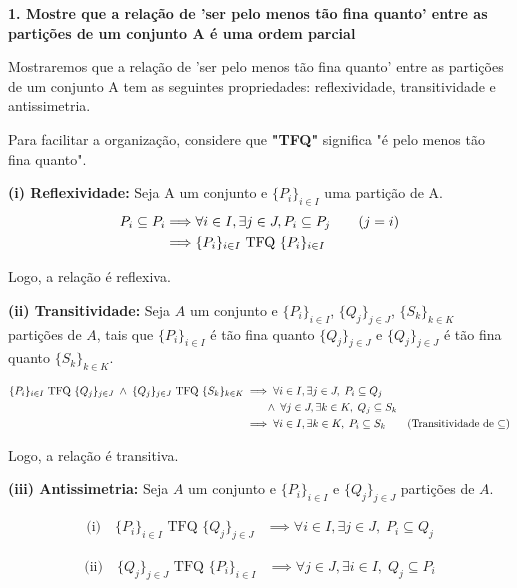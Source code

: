 \documentclass{article}
\begin{document}
\textbf{1. Mostre que a relação de 'ser pelo menos tão fina quanto' entre as partições de um conjunto A é uma ordem parcial}

Mostraremos que a relação de 'ser pelo menos tão fina quanto' entre as partições de um conjunto A tem as seguintes propriedades: reflexividade, transitividade e antissimetria.

Para facilitar a organização, considere que \textbf{"TFQ"} significa "é pelo menos tão fina quanto".

\textbf{(i) Reflexividade:}
Seja A um conjunto e $\{P_i\}_{i \in I}$ uma partição de A.
\begin{align*}
	P_i \subseteq P_i
	 & \Longrightarrow \forall i \in I, \exists j \in J, P_i \subseteq P_j \tag*{\text{($j = i$)}} \\
	 & \Longrightarrow \{P_i\}_{i \in I} \text{ TFQ } \{P_i\}_{i \in I}
\end{align*}

Logo, a relação é reflexiva.

\textbf{(ii) Transitividade:}
Seja $A$ um conjunto e $\{P_i\}_{i \in I}$, $\{Q_j\}_{j \in J}$, $\{S_k\}_{k \in K}$ partições de $A$, tais que
$\{P_i\}_{i \in I}$ é tão fina quanto $\{Q_j\}_{j \in J}$ e $\{Q_j\}_{j \in J}$ é tão fina quanto $\{S_k\}_{k \in K}$.

\begin{align*}
	\{P_i\}_{i \in I} \text{ TFQ } \{Q_j\}_{j \in J} \;\land\; \{Q_j\}_{j \in J} \text{ TFQ } \{S_k\}_{k \in K}
	 & \implies \forall i \in I, \exists j \in J,\; P_i \subseteq Q_j                                               \\
	 & \qquad\land\; \forall j \in J, \exists k \in K,\; Q_j \subseteq S_k                                          \\
	 & \implies \forall i \in I, \exists k \in K,\; P_i \subseteq S_k \tag*{\text{(Transitividade de $\subseteq$)}}
\end{align*}

Logo, a relação é transitiva.

\textbf{(iii) Antissimetria:}
Seja $A$ um conjunto e $\{P_i\}_{i \in I}$ e $\{Q_j\}_{j \in J}$ partições de $A$.

\begin{align*}
	\text{(i)}\quad
	\{P_i\}_{i \in I} \text{ TFQ } \{Q_j\}_{j \in J}
	 & \implies \forall i \in I, \exists j \in J,\; P_i \subseteq Q_j
\end{align*}

\begin{align*}
	\text{(ii)}\quad
	\{Q_j\}_{j \in J} \text{ TFQ } \{P_i\}_{i \in I}
	 & \implies \forall j \in J, \exists i \in I,\; Q_j \subseteq P_i
\end{align*}
\end{document}
